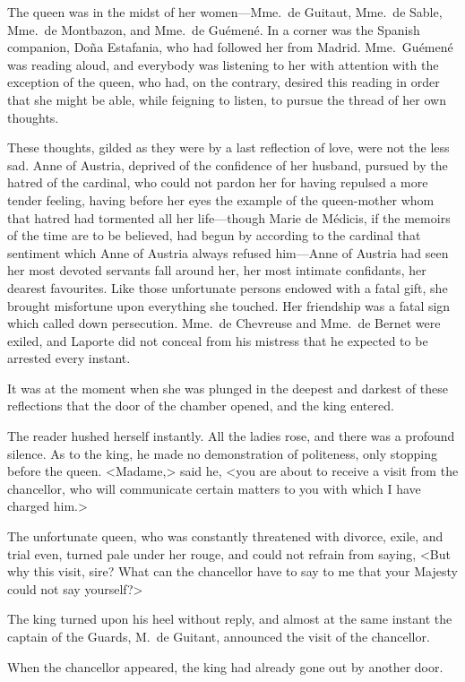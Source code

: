 The queen was in the midst of her women—Mme.~de Guitaut, Mme.~de Sable, Mme.~de Montbazon, and Mme.~de Guémené. In a corner was the Spanish companion, Doña Estafania, who had followed her from Madrid. Mme.~Guémené was reading aloud, and everybody was listening to her with attention with the exception of the queen, who had, on the contrary, desired this reading in order that she might be able, while feigning to listen, to pursue the thread of her own thoughts. 

These thoughts, gilded as they were by a last reflection of love, were not the less sad. Anne of Austria, deprived of the confidence of her husband, pursued by the hatred of the cardinal, who could not pardon her for having repulsed a more tender feeling, having before her eyes the example of the queen-mother whom that hatred had tormented all her life—though Marie de Médicis, if the memoirs of the time are to be believed, had begun by according to the cardinal that sentiment which Anne of Austria always refused him—Anne of Austria had seen her most devoted servants fall around her, her most intimate confidants, her dearest favourites. Like those unfortunate persons endowed with a fatal gift, she brought misfortune upon everything she touched. Her friendship was a fatal sign which called down persecution. Mme.~de Chevreuse and Mme.~de Bernet were exiled, and Laporte did not conceal from his mistress that he expected to be arrested every instant. 

It was at the moment when she was plunged in the deepest and darkest of these reflections that the door of the chamber opened, and the king entered. 

The reader hushed herself instantly. All the ladies rose, and there was a profound silence. As to the king, he made no demonstration of politeness, only stopping before the queen. <Madame,> said he, <you are about to receive a visit from the chancellor, who will communicate certain matters to you with which I have charged him.> 

The unfortunate queen, who was constantly threatened with divorce, exile, and trial even, turned pale under her rouge, and could not refrain from saying, <But why this visit, sire? What can the chancellor have to say to me that your Majesty could not say yourself?> 

The king turned upon his heel without reply, and almost at the same instant the captain of the Guards, M.~de Guitant, announced the visit of the chancellor. 

When the chancellor appeared, the king had already gone out by another door. 

